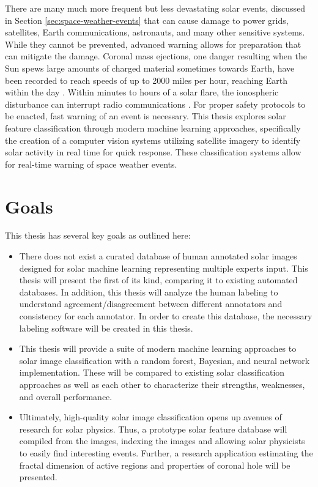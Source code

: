 \documentclass[twoside]{report}
\begin{document}
There are many much more frequent but less devastating solar events, discussed in Section \ref{sec:space-weather-events} that can cause damage to power grids, satellites, Earth communications, astronauts, and many other sensitive systems. While they cannot be prevented, advanced warning allows for preparation that can mitigate the damage. Coronal mass ejections, one danger resulting when the Sun spews large amounts of charged material sometimes towards Earth, have been recorded to reach speeds of up to 2000 miles per hour, reaching Earth within the day \cite{fastcme}. Within minutes to hours of a solar flare, the ionospheric disturbance can interrupt radio communications \cite{swap}. For proper safety protocols to be enacted, fast warning of an event is necessary.  This thesis explores solar feature classification through modern machine learning approaches, specifically the creation of a computer vision systems utilizing satellite imagery to identify solar activity in real time for quick response. These classification systems allow for real-time warning of space weather events.

\section{Goals}

This thesis has several key goals as outlined here:
\begin{itemize}
\item There does not exist a curated database of human annotated solar images designed for solar machine learning representing multiple experts input. This thesis will present the first of its kind, comparing it to existing automated databases. In addition, this thesis will analyze the human labeling to understand agreement/disagreement between different annotators and consistency for each annotator. In order to create this database, the necessary labeling software will be created in this thesis.
\item This thesis will provide a suite of modern machine learning approaches to solar image classification with a random forest, Bayesian, and neural network implementation. These will be compared to existing solar classification approaches as well as each other to characterize their strengths, weaknesses, and overall performance.
\item Ultimately, high-quality solar image classification opens up avenues of research for solar physics. Thus, a prototype solar feature database will compiled from the images, indexing the images and allowing solar physicists to easily find interesting events. Further, a research application estimating the fractal dimension of active regions and properties of coronal hole will be presented.
\end{itemize}
\end{document}
